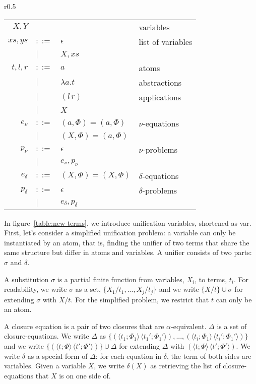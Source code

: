 \documentclass[a4paper,UKenglish]{lipics-v2016}
\newcommand{\clos}[2] {
  \langle #1; #2 \rangle
}
\newcommand{\app}[2] {
  (#1\, #2)
}
\newcommand{\pr}[2] {
 (#1\, #2)
}
\newcommand{\bd}[2] {
 #1/ #2
}
\begin{document}
\label{unify}
\begin{wrapfigure}{r}{0.5\textwidth}
  \caption{Unification terms and problems\label{table:new-terms}}
    \begin{tabular}{r l l l}  
    $X,Y$   &       &     & variables \\
      $xs,ys$ & $::=$ & $\epsilon$& list of variables \\
      & $|$&  $X,xs$ &  \\
    $t,l,r$ & $::=$ & $a$ & atoms \\
    & $|$ & $\lambda a.t$ & abstractions \\
    & $|$ & $\app{l}{r}$ & applications \\
      & $|$ & $X$ & \\
      $e_\nu$  & $::=$ & $(a,\Phi) = (a,\Phi)$ & $\nu$-equations \\
           & $|$ &  $(X,\Phi) = (a,\Phi)$ \\
      $p_\nu$  & $::=$ & $\epsilon$ & $\nu$-problems \\
           & $|$ & $e_\nu, p_\nu$ \\
      $e_\delta$  & $::=$& $(X,\Phi) = (X,\Phi)$ & $\delta$-equations \\
      $p_\delta$  & $::=$ & $\epsilon$ & $\delta$-problems \\
           & $|$ & $e_\delta, p_\delta$
    \end{tabular}
\end{wrapfigure}

In figure~\ref{table:new-terms}, we introduce unification variables,
shortened as var.  First, let's consider a simplified unification
problem: a variable can only be instantiated by an atom, that is,
finding the unifier of two terms that share the same structure but
differ in atoms and variables.  A unifier consists of two parts:
$\sigma$ and $\delta$.
\begin{definition}
  A substitution $\sigma$ is a partial finite function from variables,
  $X_i$, to terms, $t_i$.  For readability, we write $\sigma$ as a
  set, $\{\bd{X_1}{t_1}, ..., \bd{X_j}{t_j}\}$ and we write
  $\{\bd{X}{t}\} \cup \sigma$ for extending $\sigma$ with $\bd{X}{t}$.
  For the simplified problem, we restrict that $t$ can only be an atom.
\end{definition}

\begin{definition}
  A closure equation is a pair of two closures that are
  $\alpha$-equivalent.  $\Delta$ is a set of closure-equations.  We
  write $\Delta$ as $\{\pr{\clos{t_1}{\Phi_1}}{\clos{t_1'}{\Phi_1'}},
  ..., \pr{\clos{t_i}{\Phi_1}}{\clos{t_i'}{\Phi_1'}}\}$ and we write
  $\{\pr{\clos{t}{\Phi}}{\clos{t'}{\Phi'}}\}\cup\Delta$ for extending
  $\Delta$ with $\pr{\clos{t}{\Phi}}{\clos{t'}{\Phi'}}$.  We write
  $\delta$ as a special form of $\Delta$: for each equation in
  $\delta$, the term of both sides are variables.  Given a variable
  $X$, we write $\delta(X)$ as retrieving the list of
  closure-equations that $X$ is on one side of.
\end{definition}
\end{document}
